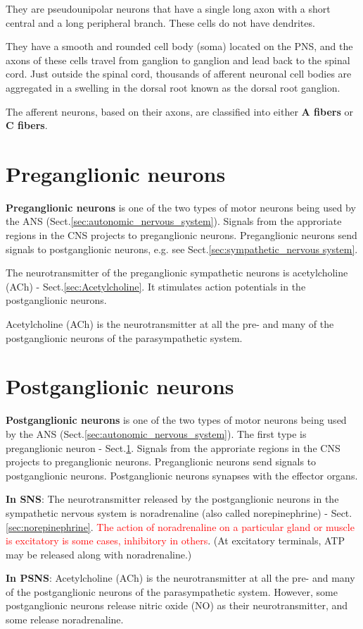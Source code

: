 They are pseudounipolar neurons that have a single long axon with a
short central and a long peripheral branch. These cells do not have dendrites.

They have a smooth and rounded cell body (soma) located on the PNS, and the
axons of these cells travel from ganglion to ganglion and lead back to the
spinal cord. Just outside the spinal cord, thousands of afferent neuronal cell
bodies are aggregated in a swelling in the dorsal root known as the dorsal root
ganglion.

The afferent neurons, based on their axons, are classified into either {\bf A
fibers} or {\bf C fibers}. 
  

\section{Preganglionic neurons}
\label{sec:preganglionic-neurons}

{\bf Preganglionic neurons} is one of the two types of motor neurons being used
by the ANS (Sect.\ref{sec:autonomic_nervous_system}). Signals from the
approriate regions in the CNS projects to preganglionic neurons. Preganglionic
neurons send signals to postganglionic neurons, e.g. see
Sect.\ref{sec:sympathetic_nervous system}.

The neurotransmitter of the preganglionic sympathetic neurons is acetylcholine
(ACh) - Sect.\ref{sec:Acetylcholine}. It stimulates action potentials in the
postganglionic neurons.

Acetylcholine (ACh) is the neurotransmitter at all the pre- and many of the
postganglionic neurons of the parasympathetic system.


\section{Postganglionic neurons}
\label{sec:postganglionic-neurons}

{\bf Postganglionic neurons} is one of the two types of motor neurons being used
by the ANS (Sect.\ref{sec:autonomic_nervous_system}). The first type is
preganglionic neuron - Sect.\ref{sec:preganglionic-neurons}. Signals from the
approriate regions in the CNS projects to preganglionic neurons. Preganglionic
neurons send signals to postganglionic neurons. Postganglionic neurons synapses
with the effector organs. 

{\bf In SNS}: The neurotransmitter released by the postganglionic neurons in the
sympathetic nervous system is noradrenaline (also called norepinephrine) -
Sect.\ref{sec:norepinephrine}.
\textcolor{red}{The action of noradrenaline on a particular gland or muscle is
excitatory is some cases, inhibitory in others}. (At excitatory terminals, ATP
may be released along with noradrenaline.)

{\bf In PSNS}: Acetylcholine (ACh) is the neurotransmitter at all the pre- and
many of the postganglionic neurons of the parasympathetic system.  However, some
postganglionic neurons release nitric oxide (NO) as their neurotransmitter, and
some release noradrenaline. 



